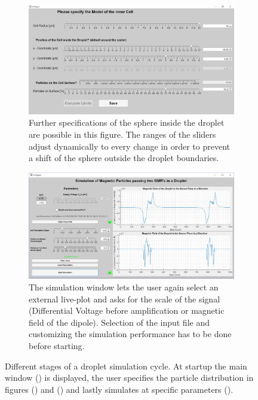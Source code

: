 \begin{landscape}
\begin{figure}
\begin{subfigure}{0.49\linewidth}
			\centering
			\includegraphics[clip,trim={0.5mm 0 0 2mm},scale=.33]{Ressourcen/IMG/GUI_inner}
			\caption{Further specifications of the sphere inside the droplet are possible in this figure. The ranges of the sliders adjust dynamically to every change in order to prevent a shift of the sphere outside the droplet boundaries.}
			\label{fig:sim:GUI:inner}
		\end{subfigure}
		\hfil
		\begin{subfigure}{0.49\linewidth} 
			\centering
			\includegraphics[clip,trim={1mm 1mm 1mm 2mm},scale=.375]{Ressourcen/IMG/GUI_simulation_2}
			\caption{The simulation window lets the user again select an external live-plot and asks for the scale of the signal (Differential Voltage before amplification or magnetic field of the dipole). Selection of the input file and customizing the simulation performance has to be done before starting.}
			\label{fig:sim:GUI:simulation}
		\end{subfigure}
		
		\caption{Different stages of a droplet simulation cycle. At startup the main window () is displayed, the user specifies the particle distribution in figures () and () and lastly simulates at specific parameters ().} 
		\label{fig:sim:GUI}
		
	\end{figure}
\end{landscape}


